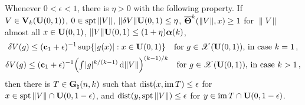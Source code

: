 \begin{lemma}
    \label{al:8.4}
    Whenever $0 < \epsilon < 1$, there is $\eta > 0$ with the following property. If $V \in
    \mathbf{V}_{k}(\mathbf{U}(0,1))$, $0 \in \operatorname{spt} \|V\|$, $\|\delta V\| \mathbf{U}(0,1) \le \eta$,
    $\boldsymbol{\overline{\Theta}}^{k}(\|V\|,x) \ge 1$ for $\|V\|$ almost all $x \in \mathbf{U}(0,1)$, $\|V\|
    \mathbf{U}(0,1) \le (1 + \eta) \boldsymbol{\alpha}(k)$,
    \begin{gather*}
        \delta V(g) \le (\mathbf{c}_1 + \epsilon)^{-1} \sup \{ |g(x)| : x \in \mathbf{U}(0,1) \} \quad
        \text{for $g \in \mathscr{X}(\mathbf{U}(0,1))$, in case $k = 1$} \,, \\
        \delta V(g) \le (\mathbf{c}_1 + \epsilon)^{-1} \Big( {\textstyle\int_{}^{}} |g|^{k/(k-1)} \,\mathrm{d}
        \|V\| \Big)^{(k-1)/k} \quad \text{for $g \in \mathscr{X}(\mathbf{U}(0,1))$, in case $k >
        1$} \,,
    \end{gather*}
    then there is $T \in \mathbf{G}_{\natural}(n,k)$ such that $\operatorname{dist}(x, \operatorname{im} T) \le \epsilon$ for $x \in
    \operatorname{spt} \|V\| \cap \mathbf{U}(0,1 - \epsilon)$, and $\operatorname{dist}(y, \operatorname{spt} \|V\|) \le \epsilon$ for $y \in
    \operatorname{im} T \cap \mathbf{U}(0,1-\epsilon)$.
\end{lemma}

